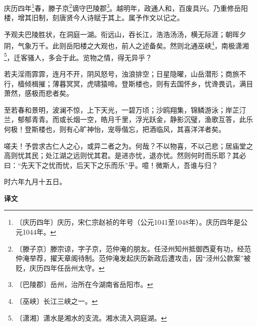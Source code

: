 \documentclass[12pt,UTF-8,openany,a4]{ctexbook}
\begin{document}
\begin{large}
    
    庆历四年\footnote{〔庆历四年〕\yiwen 庆历，宋仁宗赵祯的年号（公元1041至1048年）。庆历四年是公元1044年。}春，滕子京\footnote{〔滕子京〕\yiwen 滕宗谅，字子京，范仲淹的朋友。任泾州知州抵御西夏有功，经范仲淹举荐，擢天章阁待制。范仲淹发起庆历新政后遭攻击，因“泾州公款案”被贬，庆历四年任岳州太守。}谪守巴陵郡\footnote{〔巴陵郡〕\yiwen 岳州，治所在今湖南省岳阳市。}。越明年，政通人和，百废具兴。乃重修岳阳楼，增其旧制，刻唐贤今人诗赋于其上。属予作文以记之。
    
    予观夫巴陵胜状，在洞庭一湖。衔远山，吞长江，浩浩汤汤，横无际涯；朝晖夕阴，气象万千。此则岳阳楼之大观也，前人之述备矣。然则北通巫峡\footnote{〔巫峡〕\yiwen 长江三峡之一。}，南极潇湘\footnote{〔潇湘〕\yiwen 潇水是湘水的支流。湘水流入洞庭湖。}，迁客骚人，多会于此。览物之情，得无异乎？
    
    若夫淫雨霏霏，连月不开，阴风怒号，浊浪排空；日星隐曜，山岳潜形；商旅不行，樯倾楫摧；薄暮冥冥，虎啸猿啼。登斯楼也，则有去国怀乡，忧谗畏讥，满目萧然，感极而悲者矣。
    
    至若春和景明，波澜不惊，上下天光，一碧万顷；沙鸥翔集，锦鳞游泳；岸芷汀兰，郁郁青青。而或长烟一空，皓月千里，浮光跃金，静影沉璧，渔歌互答，此乐何极！登斯楼也，则有心旷神怡，宠辱偕忘，把酒临风，其喜洋洋者矣。
    
    嗟夫！予尝求古仁人之心，或异二者之为。何哉？不以物喜，不以己悲；居庙堂之高则忧其民；处江湖之远则忧其君。是进亦忧，退亦忧。然则何时而乐耶？其必曰：“先天下之忧而忧，后天下之乐而乐”乎。噫！微斯人，吾谁与归？
    
    时六年九月十五日。
\end{large}


\newpage

\begin{Large}
    \noindent\textbf{译文}
\end{Large}


\vspace{1em}
\end{document}
